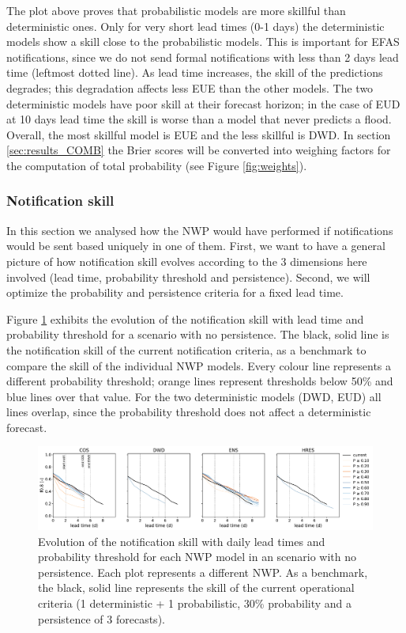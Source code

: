 \documentclass[preprint,12pt]{elsarticle}
\begin{document}
The plot above proves that probabilistic models are more skillful than deterministic ones. Only for very short lead times (0-1 days) the deterministic models show a skill close to the probabilistic models. This is important for EFAS notifications, since we do not send formal notifications with less than 2 days lead time (leftmost dotted line). As lead time increases, the skill of the predictions degrades; this degradation affects less EUE than the other models. The two deterministic models have poor skill at their forecast horizon; in the case of EUD at 10 days lead time the skill is worse than a model that never predicts a flood. Overall, the most skillful model is EUE and the less skillful is DWD. In section \ref{sec:results_COMB} the Brier scores will be converted into weighing factors for the computation of total probability (see Figure \ref{fig:weights}).

\subsubsection{Notification skill}
\label{sec:NWP_skill}

In this section we analysed how the NWP would have performed if notifications would be sent based uniquely in one of them. First, we want to have a general picture of how notification skill evolves according to the 3 dimensions here involved (lead time, probability threshold and persistence). Second, we will optimize the probability and persistence criteria for a fixed lead time.

Figure \ref{fig:NWP_skill_leadtime} exhibits the evolution of the notification skill with lead time and probability threshold for a scenario with no persistence. The black, solid line is the notification skill of the current notification criteria, as a benchmark to compare the skill of the individual NWP models. Every colour line represents a different probability threshold; orange lines represent thresholds below 50\% and blue lines over that value. For the two deterministic models (DWD, EUD) all lines overlap, since the probability threshold does not affect a deterministic forecast.

\begin{figure}
    \centering
    \includegraphics[width=1\textwidth]{figures/skill_probability_leadtime_1-1_NWP.pdf}
    \caption{Evolution of the notification skill with daily lead times and probability threshold for each NWP model in an scenario with no persistence. Each plot represents a different NWP. As a benchmark, the black, solid line represents the skill of the current operational criteria (1 deterministic + 1 probabilistic, 30\% probability and a persistence of 3 forecasts).}
    \label{fig:NWP_skill_leadtime}
\end{figure}
\end{document}
